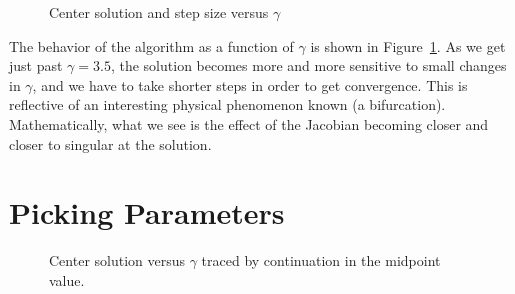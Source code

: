 \documentclass[12pt, leqno]{article} %
\begin{document}
\begin{figure}
\hspace{0.08\textwidth}
\caption{Center solution and step size versus $\gamma$}
\label{fig:vsgamma}
\end{figure}

The behavior of the algorithm as a function of $\gamma$ is shown
in Figure~\ref{fig:vsgamma}.  As we get just past $\gamma = 3.5$,
the solution becomes more and more sensitive to small changes in
$\gamma$, and we have to take shorter steps in order to get
convergence.  This is reflective of an interesting physical
phenomenon known (a bifurcation).  Mathematically, what we see
is the effect of the Jacobian becoming closer and closer to singular
at the solution.

\section*{Picking Parameters}

\begin{figure}
\caption{Center solution versus $\gamma$ traced by continuation in the
  midpoint value.}
\label{fig:vsgammam}
\end{figure}
\end{document}
